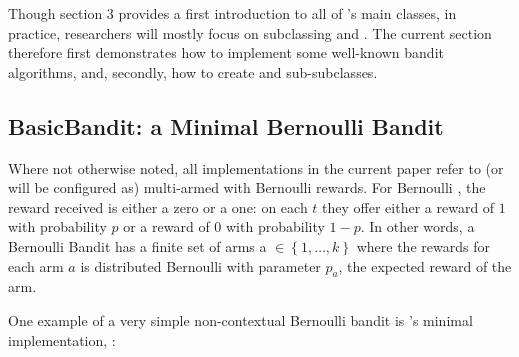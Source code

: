 \documentclass{jss}\usepackage[]{graphicx}\usepackage[]{color}
\begin{document}
Though section 3 provides a first introduction to all of 's main classes, in practice, researchers will mostly focus on subclassing  and . The current section therefore first demonstrates how to implement some well-known bandit algorithms, and, secondly, how to create  and  sub-subclasses.

\subsection{BasicBandit: a Minimal Bernoulli Bandit}

Where not otherwise noted, all  implementations in the current paper refer to (or will be configured as) multi-armed  with Bernoulli rewards. For Bernoulli , the reward received is either a zero or a one: on each $t$ they offer either a reward of $1$ with probability $p$ or a reward of $0$ with probability $1 - p$. In other words, a Bernoulli Bandit has a finite set of arms a \(  \in \left\{ 1, \dots, k \right\} \) where the rewards for each arm $a$ is distributed Bernoulli with parameter $p_a$, the expected reward of the arm.

One example of a very simple non-contextual Bernoulli bandit is 's minimal  implementation, :
\end{document}

